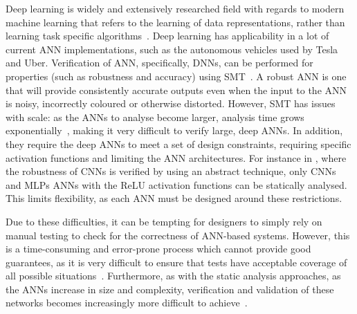 Deep learning is widely and extensively researched field with regards to modern machine learning that refers to the learning of data representations, rather than learning task specific algorithms~\cite{schmidhuber2015deep}.
Deep learning has applicability in a lot of current \ac{ANN} implementations, such as the autonomous vehicles used by Tesla and Uber.
Verification of \ac{ANN}, specifically, \acfp{DNN}, can be performed for properties (such as robustness and accuracy) using \ac{SMT}~\cite{Gehr2018AI2SA,reluplex,DeepANNverify}. 
A robust \ac{ANN} is one that will provide consistently accurate outputs even when the input to the \ac{ANN} is noisy, incorrectly coloured or otherwise distorted. 
However, \ac{SMT} has issues with scale: as the \acp{ANN} to analyse become larger, analysis time grows exponentially~\cite{Gehr2018AI2SA},
making it very difficult to verify large, deep \acp{ANN}.
In addition, they require the deep \acp{ANN} to meet a set of design constraints, requiring specific activation functions and limiting the \ac{ANN} architectures.
For instance in \cite{Gehr2018AI2SA}, where the robustness of \acfp{CNN} is verified by using an abstract technique, only \acp{CNN} and \acp{MLP} \acp{ANN} with the \ac{ReLU} activation functions can be statically analysed.
This limits flexibility, as each \ac{ANN} must be designed around these restrictions. %

Due to these difficulties, it can be tempting for designers to simply rely on manual testing to check for the correctness of \ac{ANN}-based systems. 
However, this is a time-consuming and error-prone process which cannot provide good guarantees, as it is very difficult to ensure that tests have acceptable coverage of all possible situations~\cite{ANN-test}.
Furthermore, as with the static analysis approaches, as the \acp{ANN} increase in size and complexity, verification and validation of these networks becomes increasingly more difficult to achieve~\cite{Gehr2018AI2SA}.  

